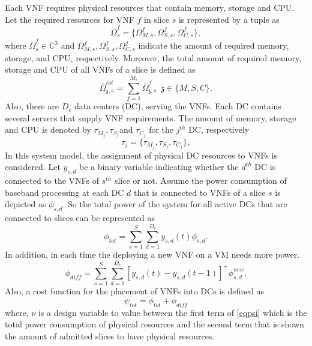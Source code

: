 \documentclass[conference]{IEEEtran}
\begin{document}
\begin{enumerate}
Each VNF requires
physical resources that contain memory, storage and CPU.
Let the required resources for VNF $f$ in slice $s$ is represented by a tuple as
\begin{equation}
\bar{\Omega}_{s}^f = \{\Omega_{M,{s}}^f, \Omega_{S,{s}}^f, \Omega_{C,{s}}^f \},
\end{equation}
where $\bar{\Omega}_{s}^f\in \mathbb{C}^{3}$ and $\Omega_{M,{s}}^f, \Omega_{S,{s}}^f, \Omega_{C,{s}}^f$ indicate the amount of required memory, storage, and CPU, respectively.
Moreover, the total amount of required memory, storage and CPU of all VNFs of a slice is defined as
\begin{equation}
\textstyle \bar{\Omega}_{\mathfrak{z},s}^{tot} = \sum_{f=1}^{M_s}\bar{\Omega}_{\mathfrak{z},s}^f \;\; \mathfrak{z} \in \{M, S, C\}.
\end{equation}
Also, there are $D_c$ data centers (DC), serving the VNFs. Each DC contains several servers that supply VNF requirements.
The amount of memory, storage and CPU is denoted by $\tau_{M_{j}}, \tau_{S_{j}}$and $\tau_{C_{j}} $ for the $j^{th}$ DC, respectively
\begin{equation*}
\tau_j = \{\tau_{M_{j}}, \tau_{S_{j}}, \tau_{C_{j}} \},
\end{equation*}
In this system model, the assignment of physical DC resources to VNFs is considered. Let $y_{s,d}$ be a binary variable indicating whether the $d^{th}$ DC is connected to the VNFs of $s^{th}$ slice or not.
Assume the power consumption of baseband processing at each DC $d$ that is connected to VNFs of a slice $s$ is depicted as
$\phi_{s,d}$. So the total power of the system for all active DCs that are connected to slices can be represented as
\begin{equation*}
\textstyle \phi_{tot} = \sum_{s=1}^{S}\sum_{d=1}^{D_c}y_{s,d}(t)\phi_{s,d}.
\end{equation*}
In addition, in each time the deploying a new VNF on a VM needs more power.
\begin{equation*}
\textstyle \phi_{diff} = \sum_{s=1}^{S}\sum_{d=1}^{D_c}[y_{s,d}(t)-y_{s,d}(t-1)]^+\phi_{s,d}^{new}.
\end{equation*}
Also, a cost function for the placement of VNFs into DCs is defined as
\begin{equation}\label{eqpsi}
\textstyle  \psi_{tot} = \phi_{tot} + \phi_{diff}
\end{equation}
where, $\nu$ is a design variable to value between the first term of \eqref{eqpsi} which is the total power consumption of physical resources and the second term that is shown the amount of admitted slices to have physical resources.

\end{enumerate}
\end{document}

